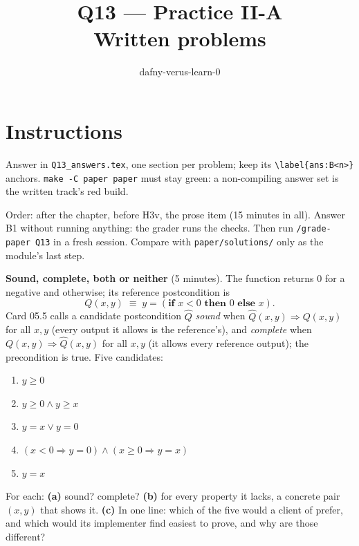 \documentclass[11pt]{article}
\title{Q13 --- Practice II-A \\ \large Written problems}
\author{dafny-verus-learn-0}
\date{}
\begin{document}
\maketitle

\section*{Instructions}
Answer in \texttt{Q13\_answers.tex}, one section per problem; keep its
\verb+\label{ans:B<n>}+ anchors. \texttt{make -C paper paper} must stay green:
a non-compiling answer set is the written track's red build.

Order: after the chapter, before H3v, the prose item (15 minutes in all).
Answer B1 without running anything: the grader runs the checks. Then run
\texttt{/grade-paper Q13} in a fresh session. Compare with
\texttt{paper/solutions/} only as the module's last step.

\begin{problem}[concept]\label{prob:B1}
\textbf{Sound, complete, both or neither} (5 minutes). The function
 returns $0$ for a negative  and 
otherwise; its reference postcondition is
\[ Q(x, y) \;\equiv\; y = (\textbf{if } x < 0 \textbf{ then } 0 \textbf{ else } x). \]
Card 05.5 calls a candidate postcondition $\hat Q$ \emph{sound} when
$\hat Q(x, y) \Rightarrow Q(x, y)$ for all $x, y$ (every output it allows is
the reference's), and \emph{complete} when $Q(x, y) \Rightarrow \hat Q(x, y)$
for all $x, y$ (it allows every reference output); the precondition is
\textsf{true}. Five candidates:
\begin{enumerate}
\item[$Q_1$] $y \ge 0$
\item[$Q_2$] $y \ge 0 \wedge y \ge x$
\item[$Q_3$] $y = x \vee y = 0$
\item[$Q_4$] $(x < 0 \Rightarrow y = 0) \wedge (x \ge 0 \Rightarrow y = x)$
\item[$Q_5$] $y = x$
\end{enumerate}
For each: \textbf{(a)} sound? complete? \textbf{(b)} for every property it
lacks, a concrete pair $(x, y)$ that shows it. \textbf{(c)} In one line: which
of the five would a client of  prefer, and which would its
implementer find easiest to prove, and why are those different?
\end{problem}
\end{document}
